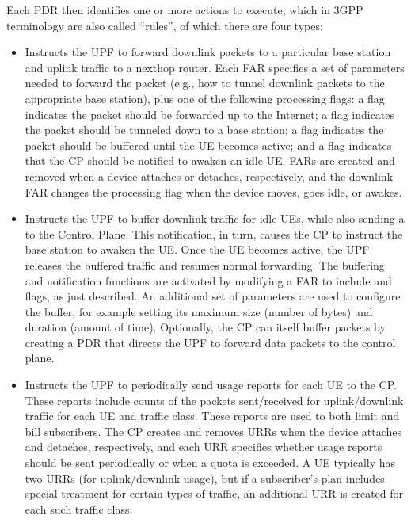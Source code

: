 \documentclass[a4paper,11pt,english]{sphinxmanual}
\begin{document}
\sphinxAtStartPar
Each PDR then identifies one or more actions to execute, which in 3GPP
terminology are also called “rules”, of which there are four types:
\begin{itemize}
\item {} 
\sphinxAtStartPar
{} Instructs the UPF to forward
downlink packets to a particular base station and uplink traffic to
a next\sphinxhyphen{}hop router. Each FAR specifies a set of parameters needed to
forward the packet (e.g., how to tunnel downlink packets to the
appropriate base station), plus one of the following processing
flags: a  flag indicates the packet should be forwarded up
to the Internet; a  flag indicates the packet should be
tunneled down to a base station; a  flag indicates the
packet should be buffered until the UE becomes active; and a
 flag indicates that the CP should be notified to awaken an
idle UE. FARs are created and removed when a device attaches or
detaches, respectively, and the downlink FAR changes the processing
flag when the device moves, goes idle, or awakes.

\item {} 
\sphinxAtStartPar
{} Instructs the UPF to buffer
downlink traffic for idle UEs, while also sending a  to the Control Plane. This notification, in turn,
causes the CP to instruct the base station to awaken the UE. Once
the UE becomes active, the UPF releases the buffered traffic and
resumes normal forwarding. The buffering and notification functions
are activated by modifying a FAR to include  and 
flags, as just described. An additional set of parameters are used
to configure the buffer, for example setting its maximum size
(number of bytes) and duration (amount of time). Optionally, the CP
can itself buffer packets by creating a PDR that directs the UPF to
forward data packets to the control plane.

\item {} 
\sphinxAtStartPar
{} Instructs the UPF to periodically
send usage reports for each UE to the CP. These reports include
counts of the packets sent/received for uplink/downlink traffic for
each UE and traffic class.  These reports are used to both limit and
bill subscribers. The CP creates and removes URRs when the device
attaches and detaches, respectively, and each URR specifies whether
usage reports should be sent periodically or when a quota is
exceeded. A UE typically has two URRs (for uplink/downlink usage),
but if a subscriber’s plan includes special treatment for certain
types of traffic, an additional URR is created for each such traffic
class.


\end{itemize}
\end{document}
